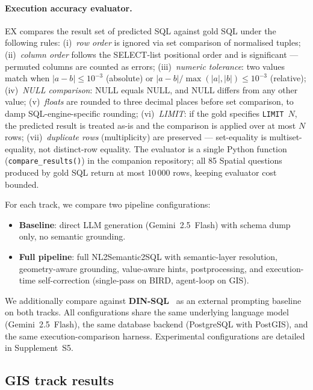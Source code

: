 \documentclass[11pt]{article}
\begin{document}
\paragraph{Execution accuracy evaluator.}
EX compares the result set of predicted SQL against gold SQL under the
following rules:
(i)~\emph{row order} is ignored via set comparison of normalised tuples;
(ii)~\emph{column order} follows the SELECT-list positional order and is
significant --- permuted columns are counted as errors;
(iii)~\emph{numeric tolerance}: two values match when
$|a-b| \le 10^{-3}$ (absolute) or $|a-b| / \max(|a|,|b|) \le 10^{-3}$
(relative);
(iv)~\emph{NULL comparison}: NULL equals NULL, and NULL differs from any
other value;
(v)~\emph{floats} are rounded to three decimal places before set
comparison, to damp SQL-engine-specific rounding;
(vi)~\emph{LIMIT}: if the gold specifies \texttt{LIMIT}~$N$, the predicted
result is treated as-is and the comparison is applied over at most $N$ rows;
(vii)~\emph{duplicate rows} (multiplicity) are preserved --- set-equality
is multiset-equality, not distinct-row equality.
The evaluator is a single Python function (\texttt{compare\_results()}) in
the companion repository; all 85 Spatial questions produced by gold SQL
return at most 10\,000 rows, keeping evaluator cost bounded.

For each track, we compare two pipeline configurations:
\begin{itemize}[leftmargin=*]
  \item \textbf{Baseline}: direct LLM generation (Gemini~2.5~Flash) with schema dump only, no semantic grounding.
  \item \textbf{Full pipeline}: full NL2Semantic2SQL with semantic-layer resolution, geometry-aware grounding, value-aware hints, postprocessing, and execution-time self-correction (single-pass on BIRD, agent-loop on GIS).
\end{itemize}

We additionally compare against \textbf{DIN-SQL}~\citep{pourreza2023dinsql} as an external prompting baseline on both tracks. All configurations share the same underlying language model (Gemini~2.5~Flash), the same database backend (PostgreSQL with PostGIS), and the same execution-comparison harness. Experimental configurations are detailed in Supplement~S5.

\subsection{GIS track results}
\label{sec:gis-results}
\end{document}
